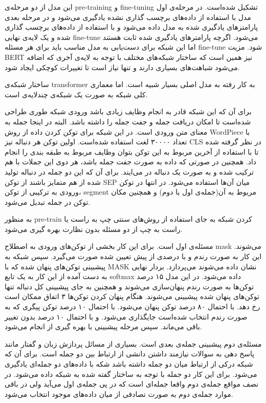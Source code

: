 \documentclass[12pt, a4paper, oneside]{report}
\begin{document}
این مدل از دو مرحله‌ی
pre-training
و
fine-tuning
تشکیل شده‌است. در مرحله‌ی اول مدل با استفاده از داده‌های برچسب گذاری نشده یادگیری می‌شود و در مرحله بعدی پارامتر‌های
یادگیری شده به مدل داده می‌شود و با استفاده از داده‌های برچسب گذاری شده و یک لایه‌ی نهایی
fine-tune
می‌شود. اگرچه پارامتر‌های یادگیری شده ثابت هستند اما این شبکه برای دست‌یابی به مدل مناسب باید برای هر مسئله
fine-tune
شود. مزیت
BERT
نیز همین است که ساختار شبکه‌های مختلف با توجه به لایه‌ی آخری که اضافه می‌شود شباهت‌های بسیاری دارند و تنها نیاز است
تا تغییرات کوچکی ایجاد شود.

ساختار شبکه‌ی
transformer
به کار رفته به مدل اصلی بسیار شبیه است. اما معماری کلی شبکه به صورت یک شبکه‌ی چندلایه‌ی
است. 

برای آن که این شبکه قادر به انجام وظایف زیادی باشد ورودی شبکه طوری طراحی شده‌است تا امکان دریافت جمله و جفت جمله
را داشته باشد. البته در اینجا جمله به معنای متن ورودی است.
در این شبکه برای توکن کردن داده از روش
WordPiece
با تعداد ۳۰۰۰۰ لغت استفاده شده‌است. اولین توکن هر دنباله نیز
CLS
در نظر گرفته شده تا با استفاده از آخرین
مربوط به این توکن بتوان وظایف مربوط به طبقه بندی را انجام داد.
همچنین در صورتی که داده به صورت جفت جمله باشد، هر دوی این جملات با هم ترکیب شده و به صورت یک دنباله در می‌ایند.
برای آن که این دو جمله در دنباله تولید شده از هم متمایز باشند از توکن
SEP
میان آن‌ها استفاده می‌شود. در انتها در توکن ورودی به ترکیبی از توکن،
segment
مربوط به آن(جمله‌ی اول یا دوم)
و همچنین مکان توکن در جمله تبدیل می‌شود.

به منظور
pre-train
کردن شبکه‌ به جای استفاده از روش‌های سنتی چپ به راست یا راست به چپ از دو مسئله بدون نظارت بهره گیری می‌شود.

مسئله‌ی اول
است. برای این کار بخشی از توکن‌های ورودی به اصطلاح
mask
می‌شوند. این کار به صورت رندم و با درصدی از پیش تعیین شده صورت می‌گیرد. سپس شبکه به پیشبینی توکن‌های پنهان شده
که با 
MASK
نشان داده می‌شوند می‌پردازد. بردار نهایی به دست آمده از این کار به یک تابع
softmax
داده می‌شود. در این مدل ۱۵ درصد توکن‌ها به صورت رندم پنهان‌سازی می‌شوند و همچنین به جای پیشبینی کل دنباله تنها
توکن‌های پنهان شده پیشبینی می‌شوند. هنگام پنهان کردن توکن‌ها ۳ اتفاق ممکان است رخ دهد. با احتمال ۸۰ درصد توکن
پنهان می‌شود. با احتمال ۱۰ درصد توکن پیگری که به صورت رندم انتخاب شده‌است جایگذاری می‌شود. و با احتمال ۱۰ درصد
بدون تغییر باقی می‌ماند. سپس مرحله پیشبینی با بهره گیری از
انجام می‌شود.

مسئله‌ی دوم پیشبینی جمله‌ی بعدی است. بسیاری از مسائل پردازش زبان و گفتار مانند پاسخ دهی به سوالات نیازمند داشتن
دانشی از ارتباط بین دو جمله است. برای آن که شبکه درکی از ارتباط میان دو جمله داشته باشد شکه با داده‌های دو جمله‌ای
یادگیری می‌شود. برای این کار دو جمله با توجه به ساختار گفته شده به شبکه داده می‌شود. در نصف مواقع جمله‌ی دوم
واقعا جمله‌ای است که در پی جمله‌ی اول می‌آید ولی در باقی موارد جمله‌ی دوم به صورت تصادفی از میان داده‌های موجود
انتخاب می‌شود.
\end{document}
